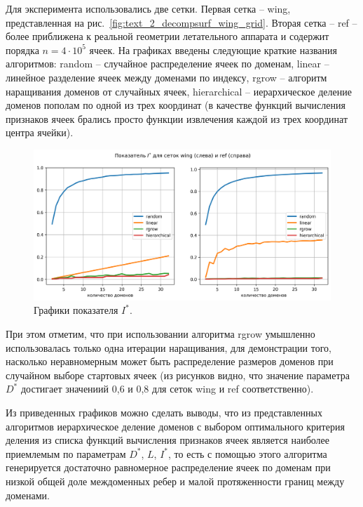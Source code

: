 Для эксперимента использовались две сетки.
Первая сетка -- wing, представленная на рис.~\ref{fig:text_2_decompsurf_wing_grid}.
Вторая сетка -- ref -- более приближена к реальной геометрии летательного аппарата и содержит порядка $n = 4 \cdot 10^5$ ячеек.
На графиках введены следующие краткие названия алгоритмов: random -- случайное распределение ячеек по доменам, linear -- линейное разделение ячеек между доменами по индексу, rgrow -- алгоритм наращивания доменов от случайных ячеек, hierarchical -- иерархическое деление доменов пополам по одной из трех координат (в качестве функций вычисления признаков ячеек брались просто функции извлечения каждой из трех координат центра ячейки).

\begin{figure}[H]
	\centering
	\includegraphics[width=1.0\textwidth]{./pics/text_2_decompsurf/qual_I_star.png}
	\caption{Графики показателя $I^{*}$.}
	\label{fig:text_2_decompsurf_qual_I_star}
\end{figure}

При этом отметим, что при использовании алгоритма rgrow умышленно использовалась только одна итерации наращивания, для демонстрации того, насколько неравномерным может быть распределение размеров доменов при случайном выборе стартовых ячеек (из рисунков видно, что значение параметра $D^{*}$ достигает значениий 0,6 и 0,8 для сеток wing и ref соответственно).

Из приведенных графиков можно сделать выводы, что из представленных алгоритмов иерархическое деление доменов с выбором оптимального критерия деления из списка функций вычисления признаков ячеек является наиболее приемлемым по параметрам $D^{*}$, $L$, $I^{*}$, то есть с помощью этого алгоритма генерируется достаточно равномерное распределение ячеек по доменам при низкой общей доле междоменных ребер и малой протяженности границ между доменами.
